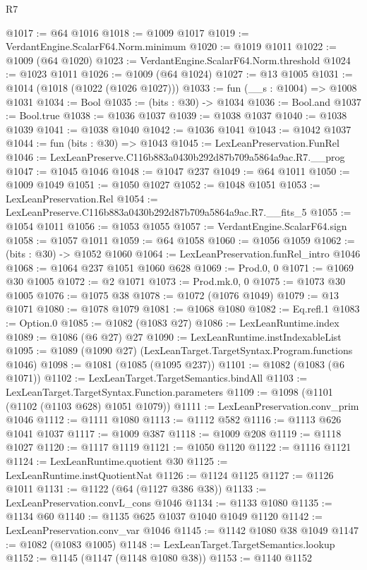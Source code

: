 \begin{lexlean}{R7}
\begin{coremodule}
@1017 := @64 @1016
@1018 := @1009 @1017
@1019 := VerdantEngine.ScalarF64.Norm.minimum
@1020 := @1019 @1011
@1022 := @1009 (@64 @1020)
@1023 := VerdantEngine.ScalarF64.Norm.threshold
@1024 := @1023 @1011
@1026 := @1009 (@64 @1024)
@1027 := @13 @1005
@1031 := @1014 (@1018 (@1022 (@1026 @1027)))
@1033 := fun (__s : @1004) => @1008 @1031
@1034 := Bool
@1035 := (bits : @30) -> @1034
@1036 := Bool.and
@1037 := Bool.true
@1038 := @1036 @1037
@1039 := @1038 @1037
@1040 := @1038 @1039
@1041 := @1038 @1040
@1042 := @1036 @1041
@1043 := @1042 @1037
@1044 := fun (bits : @30) => @1043
@1045 := LexLeanPreservation.FunRel
@1046 := LexLeanPreserve.C116b883a0430b292d87b709a5864a9ac.R7.__prog
@1047 := @1045 @1046
@1048 := @1047 @237
@1049 := @64 @1011
@1050 := @1009 @1049
@1051 := @1050 @1027
@1052 := @1048 @1051
@1053 := LexLeanPreservation.Rel
@1054 := LexLeanPreserve.C116b883a0430b292d87b709a5864a9ac.R7.__fits_5
@1055 := @1054 @1011
@1056 := @1053 @1055
@1057 := VerdantEngine.ScalarF64.sign
@1058 := @1057 @1011
@1059 := @64 @1058
@1060 := @1056 @1059
@1062 := (bits : @30) -> @1052 @1060
@1064 := LexLeanPreservation.funRel_intro @1046
@1068 := @1064 @237 @1051 @1060 @628
@1069 := Prod.{0, 0}
@1071 := @1069 @30 @1005
@1072 := @2 @1071
@1073 := Prod.mk.{0, 0}
@1075 := @1073 @30 @1005
@1076 := @1075 @38
@1078 := @1072 (@1076 @1049)
@1079 := @13 @1071
@1080 := @1078 @1079
@1081 := @1068 @1080
@1082 := Eq.refl.{1}
@1083 := Option.{0}
@1085 := @1082 (@1083 @27)
@1086 := LexLeanRuntime.index
@1089 := @1086 (@6 @27) @27
@1090 := LexLeanRuntime.instIndexableList
@1095 := @1089 (@1090 @27) (LexLeanTarget.TargetSyntax.Program.functions @1046)
@1098 := @1081 (@1085 (@1095 @237))
@1101 := @1082 (@1083 (@6 @1071))
@1102 := LexLeanTarget.TargetSemantics.bindAll
@1103 := LexLeanTarget.TargetSyntax.Function.parameters
@1109 := @1098 (@1101 (@1102 (@1103 @628) @1051 @1079))
@1111 := LexLeanPreservation.conv_prim @1046
@1112 := @1111 @1080
@1113 := @1112 @582
@1116 := @1113 @626 @1041 @1037
@1117 := @1009 @387
@1118 := @1009 @208
@1119 := @1118 @1027
@1120 := @1117 @1119
@1121 := @1050 @1120
@1122 := @1116 @1121
@1124 := LexLeanRuntime.quotient @30
@1125 := LexLeanRuntime.instQuotientNat
@1126 := @1124 @1125
@1127 := @1126 @1011
@1131 := @1122 (@64 (@1127 @386 @38))
@1133 := LexLeanPreservation.convL_cons @1046
@1134 := @1133 @1080
@1135 := @1134 @60
@1140 := @1135 @625 @1037 @1040 @1049 @1120
@1142 := LexLeanPreservation.conv_var @1046
@1145 := @1142 @1080 @38 @1049
@1147 := @1082 (@1083 @1005)
@1148 := LexLeanTarget.TargetSemantics.lookup
@1152 := @1145 (@1147 (@1148 @1080 @38))
@1153 := @1140 @1152

\end{coremodule}
\end{lexlean}
